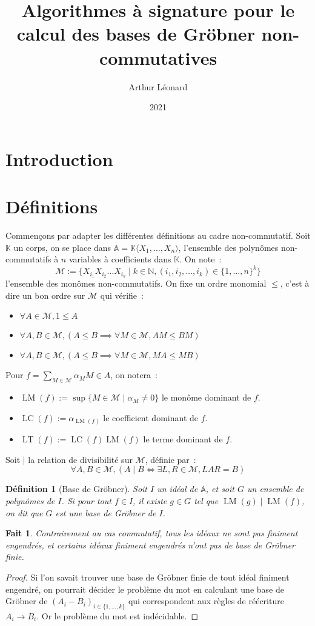 \documentclass{article}
\title{Algorithmes à signature pour le calcul des bases de Gröbner non-commutatives}
\author{Arthur Léonard}
\date{2021}
\newtheorem*{fact}{Fait}
\newtheorem*{dfn}{Définition}
\newcommand{\N}{\mathbb{N}}
\newcommand{\K}{\mathbb{K}}
\newcommand{\chev}[1]{\langle #1 \rangle}
\newcommand{\A}{\mathbb{A}}
\newcommand{\M}{\mathcal{M}}
\DeclareMathOperator{\LM}{LM}
\DeclareMathOperator{\LC}{LC}
\DeclareMathOperator{\LT}{LT}
\begin{document}
\maketitle

\section*{Introduction}

\section*{Définitions}
Commençons par adapter les différentes définitions au cadre non-commutatif.
Soit $\K$ un corps, on se place dans $\A = \K \chev{X_1, \dots, X_n}$, l'ensemble des polynômes non-commutatifs à $n$ variables à coefficients dans $\K$. On note~: 
$$\M := \{X_{i_1}X_{i_2} \dots X_{i_k} \;|\; k \in \N, (i_1, i_2, \dots, i_k) \in \{1, \dots, n\}^k \}$$
l'ensemble des monômes non-commutatifs. On fixe un ordre monomial $\leq$, c'est à dire un bon ordre sur $\M$ qui vérifie~:
\begin{itemize}
\item $\forall A \in \M, 1 \leq A$
\item $\forall A, B \in \M, (A \leq B \implies \forall M \in \M, AM \leq BM)$
\item $\forall A, B \in \M, (A \leq B \implies \forall M \in \M, MA \leq MB)$
\end{itemize}
Pour $f = \sum_{M \in \M} \alpha_M M \in A$, on notera~:
\begin{itemize}
\item $\LM(f) := \sup \{ M \in \M \;|\; \alpha_M \neq 0 \}$ le monôme dominant de $f$.
\item $\LC(f) := \alpha_{\LM(f)}$ le coefficient dominant de $f$.
\item $\LT(f) := \LC(f)\LM(f)$ le terme dominant de $f$.
\end{itemize}
Soit $|$ la relation de divisibilité sur $\M$, définie par~:
$$\forall A, B \in \M, (A \;|\; B \iff \exists L, R \in \M, LAR = B)$$

\begin{dfn}[Base de Gröbner]
	Soit $I$ un idéal de $\A$, et soit $G$ un ensemble de polynômes de $I$.
	Si pour tout $f \in I$, il existe $g \in G$ tel que $\LM(g) \;|\; \LM(f)$, on dit que $G$ est une base de Gröbner de $I$.
\end{dfn}

\begin{fact}
	Contrairement au cas commutatif, tous les idéaux ne sont pas finiment engendrés, et certains idéaux finiment engendrés n'ont pas de base de Gröbner finie.
\end{fact}
\begin{proof}
	Si l'on savait trouver une base de Gröbner finie de tout idéal finiment engendré, on pourrait décider le problème du mot en calculant une base de Gröbner de $(A_i - B_i)_{i \in \{1, \dots, k\}}$ qui correspondent aux règles de réécriture $A_i \rightarrow B_i$. 
	Or le problème du mot est indécidable.
\end{proof}
\end{document}
